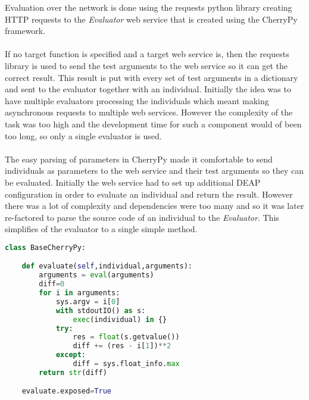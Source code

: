 Evaluation over the network is done using the requests python library creating HTTP requests to the \textit{Evaluator} web service that is created using the CherryPy framework.
\paragraph{}
If no target function is specified and a target web service is, then the requests library is used to send the test arguments to the web service so it can get the correct result. This result
is put with every set of test arguments in a dictionary and sent to the evaluator together with an individual. Initially the idea was to have multiple evaluators processing the
individuals which meant making asynchronous requests to multiple web services. However the complexity of the task was too high and the development time for such a component would
of been too long, so only a single evaluator is used.
\paragraph{}
The easy parsing of parameters in CherryPy made it comfortable to send individuals as parameters to the web service and their test arguments so they can be evaluated. Initially
the web service had to set up additional DEAP configuration in order to evaluate an individual and return the result. However there was a lot of complexity and dependencies were
too many and so it was later re-factored to parse the source code of an individual to the \textit{Evaluator}. This simplifies of the evaluator to 
a single simple method.

\begin{lstlisting}[language=Python,caption={The soruce of the evaluator},label={lst:evaluator}]
class BaseCherryPy:

    def evaluate(self,individual,arguments):
        arguments = eval(arguments)
        diff=0
        for i in arguments:
            sys.argv = i[0]
            with stdoutIO() as s:
                exec(individual) in {}
            try:
                res = float(s.getvalue())
                diff += (res - i[1])**2
            except:
                diff = sys.float_info.max
        return str(diff)

    evaluate.exposed=True
\end{lstlisting}

